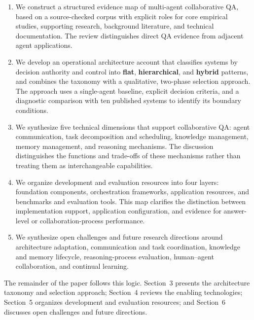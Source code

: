 \documentclass[a4paper,fleqn]{cas-dc}
\begin{document}
\begin{enumerate}
  \item We construct a structured evidence map of multi-agent collaborative
        QA, based on a source-checked corpus with explicit roles for core empirical
        studies, supporting research, background literature, and technical
        documentation. The review distinguishes direct QA evidence from
        adjacent agent applications.
  \item We develop an operational architecture account that classifies
        systems by decision authority and control into \textbf{flat},
        \textbf{hierarchical}, and \textbf{hybrid} patterns, and combines the
        taxonomy with a qualitative, two-phase selection approach. The approach
        uses a single-agent baseline, explicit decision criteria, and a
        diagnostic comparison with ten published systems to identify its
        boundary conditions.
  \item We synthesize five technical dimensions that support collaborative QA:
        agent communication, task decomposition and scheduling, knowledge
        management, memory management, and reasoning mechanisms. The discussion
        distinguishes the functions and trade-offs of these mechanisms rather
        than treating them as interchangeable capabilities.
  \item We organize development and evaluation resources into four layers:
        foundation components, orchestration frameworks, application
        resources, and benchmarks and evaluation tools. This map clarifies the
        distinction between implementation support, application configuration,
        and evidence for answer-level or collaboration-process performance.
  \item We synthesize open challenges and future research directions around
        architecture adaptation, communication and task coordination, knowledge
        and memory lifecycle, reasoning-process evaluation, human--agent
        collaboration, and continual learning.
\end{enumerate}

The remainder of the paper follows this logic. Section~3 presents the
architecture taxonomy and selection approach; Section~4 reviews the enabling
technologies; Section~5 organizes development and evaluation resources; and
Section~6 discusses open challenges and future directions.

\end{document}
